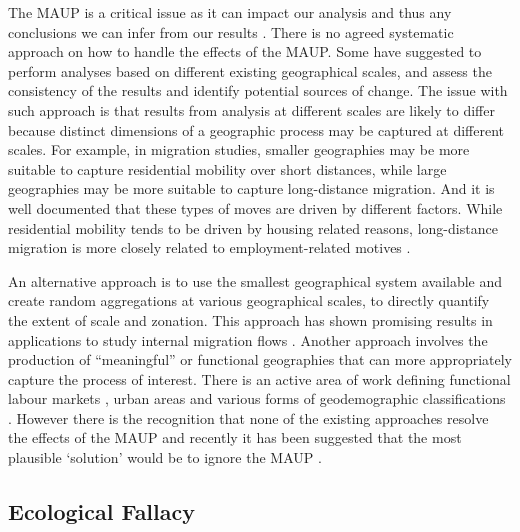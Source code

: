 \documentclass[
]{book}
\begin{document}
The MAUP is a critical issue as it can impact our analysis and thus any conclusions we can infer from our results \citep[e.g.][]{fotheringham1991modifiable}. There is no agreed systematic approach on how to handle the effects of the MAUP. Some have suggested to perform analyses based on different existing geographical scales, and assess the consistency of the results and identify potential sources of change. The issue with such approach is that results from analysis at different scales are likely to differ because distinct dimensions of a geographic process may be captured at different scales. For example, in migration studies, smaller geographies may be more suitable to capture residential mobility over short distances, while large geographies may be more suitable to capture long-distance migration. And it is well documented that these types of moves are driven by different factors. While residential mobility tends to be driven by housing related reasons, long-distance migration is more closely related to employment-related motives \citep{niedomysl2011migration}.

An alternative approach is to use the smallest geographical system available and create random aggregations at various geographical scales, to directly quantify the extent of scale and zonation. This approach has shown promising results in applications to study internal migration flows \citep{stillwell2018spatial}. Another approach involves the production of ``meaningful'' or functional geographies that can more appropriately capture the process of interest. There is an active area of work defining functional labour markets \citep{casado2017evolutionary}, urban areas \citep{arribas2019building} and various forms of geodemographic classifications \citep{singleton2014past, patias2019scalable}. However there is the recognition that none of the existing approaches resolve the effects of the MAUP and recently it has been suggested that the most plausible `solution' would be to ignore the MAUP \citep{wolf2020quantitative}.

\hypertarget{ecological-fallacy}{%
\subsection{Ecological Fallacy}\label{ecological-fallacy}}
\end{document}

